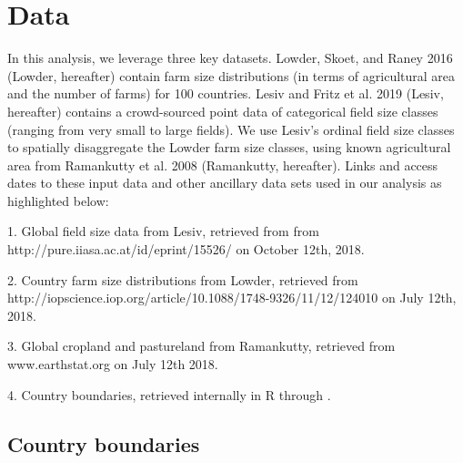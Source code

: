 \documentclass{article}\usepackage[]{graphicx}\usepackage[]{xcolor}
\begin{document}
\section{Data}

In this analysis, we leverage three key datasets. Lowder, Skoet, and Raney 2016 \cite{Lowder} (Lowder, hereafter) contain farm size distributions (in terms of agricultural area and the number of farms) for 100 countries. Lesiv and Fritz et al. 2019 \cite{Lesiv} (Lesiv, hereafter) contains a crowd-sourced point data of categorical field size classes (ranging from very small to large fields). We use Lesiv’s ordinal field size classes to spatially disaggregate the Lowder farm size classes, using known agricultural area from Ramankutty et al. 2008 \cite{Ramankutty} (Ramankutty, hereafter). Links and access dates to these input data and other ancillary data sets used in our analysis as highlighted below:

1. Global field size data from Lesiv, retrieved from from http://pure.iiasa.ac.at/id/eprint/15526/ on October 12th, 2018.

2. Country farm size distributions from Lowder, retrieved from 
http://iopscience.iop.org/article/10.1088/1748-9326/11/12/124010 on July 12th, 2018.

3. Global cropland and pastureland from Ramankutty, retrieved from www.earthstat.org on July 12th 2018.

4. Country boundaries, retrieved internally in R through \cite{R-rworldmap}.


\subsection{Country boundaries}
\end{document}
